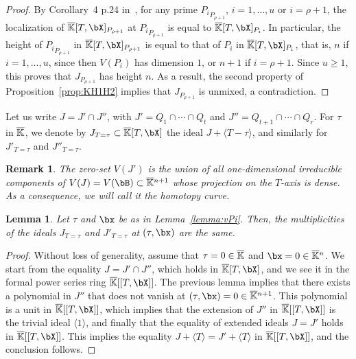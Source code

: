\documentclass[12pt]{article}
\newtheorem{lemma}[definition]{Lemma}
\newtheorem{remark}[definition]{Remark}
\begin{document}
\begin{proof}
  By Corollary~4 p.24 in~\cite{Matsumura86}, for any prime
  ${P_i}_{P_{\rho+1}}$, $i=1,\dots,u$ or $i=\rho+1$, the localization of
  $\KKbar[T,\bX]_{P_{\rho+1}}$ at ${P_i}_{P_{\rho+1}}$ is equal to
  $\KKbar[T,\bX]_{P_{i}}$. In particular, the height of
  ${P_i}_{P_{\rho+1}}$ in $\KKbar[T,\bX]_{P_{\rho+1}}$ is equal to that of
  $P_i$ in $\KKbar[T,\bX]_{P_{i}}$, that is, $n$ if $i=1,\dots,u$,
  since then $V(P_i)$ has dimension $1$, or $n+1$ if $i=\rho+1$. Since $u
  \ge 1$, this proves that $J_{P_{\rho+1}}$ has height $n$. As a result,
  the second property of Proposition~\ref{prop:KH1H2} implies that
  $J_{P_{\rho+1}}$ is unmixed, a contradiction.
\end{proof}

Let us write $J=J' \cap J''$, with $J'=Q_1 \cap \cdots \cap Q_t$ and
$J''=Q_{t+1} \cap \cdots \cap Q_r$. For $\tau$ in $\overline{\mathbb{K}}$, we denote
by $J_{T=\tau} \subset \KKbar[T,\bX]$ the ideal $J + \langle T-\tau \rangle$,
and similarly for $J'_{T=\tau}$ and $ J''_{T=\tau}$.

\begin{remark}\label{rem:Jprime}
  The zero-set $V(J')$ is the union of all one-dimensional irreducible
  components of $V(J)=V(\bB) \subset \KKbar{}^{n+1}$ whose projection on
  the $T$-axis is dense. As a consequence, we will call it the {\em
    homotopy curve}.
\end{remark}

\begin{lemma}\label{lemma:JJprime}
  Let $\tau$ and $\bx$ be as in Lemma~\ref{lemma:vPi}. Then, the
  multiplicities of the ideals $J_{T=\tau}$ and $J'_{T=\tau}$ at $(\tau,\bx)$
  are the same.
\end{lemma}
\begin{proof}
  Without loss of generality, assume that $\tau=0 \in \overline{\mathbb{K}}$ and
  $\bx=0 \in \KKbar{}^n$. We start from the equality $J=J' \cap J''$,
  which holds in $\KKbar[T,\bX]$, and we see it in the formal power
  series ring $\KKbar[[T,\bX]]$.  The previous lemma implies that
  there exists a polynomial in $J''$ that does not vanish at
  $(\tau,\bx)=0 \in \KKbar{}^{n+1}$.  This polynomial is a unit in
  $\KKbar[[T,\bX]]$, which implies that the extension of $J''$ in
  $\KKbar[[T,\bX]]$ is the trivial ideal $\langle 1 \rangle$, and
  finally that the equality of extended ideals $J=J'$ holds in
  $\KKbar[[T,\bX]]$. This implies the equality
  $J+\langle T \rangle =J'+\langle T \rangle $ in $\KKbar[[T,\bX]]$,
  and the conclusion follows.
\end{proof}
\end{document}
